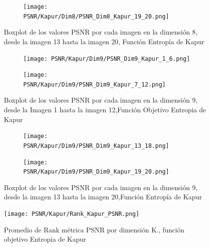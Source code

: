 \documentclass[conference]{IEEEtran}
\begin{document}
\begin{figure}[htbp]
	\centering

	\begin{subfigure}{0.5\textwidth}
		\centering
		\texttt{[image: PSNR/Kapur/Dim8/PSNR\_Dim8\_Kapur\_19\_20.png]}
	\end{subfigure}
	\caption{Boxplot de los valores PSNR por cada imagen en la dimensión 8, desde la imagen 13 hasta la imagen 20, Función Entropía de Kapur}
	\label{fig:imagenes_dim8_13_20}    
\end{figure}


\begin{figure}[htbp]
	\centering
	
	\begin{subfigure}{0.5\textwidth}
		\texttt{[image: PSNR/Kapur/Dim9/PSNR\_Dim9\_Kapur\_1\_6.png]}
	\end{subfigure}
	
	\begin{subfigure}{0.5\textwidth}
		\texttt{[image: PSNR/Kapur/Dim9/PSNR\_Dim9\_Kapur\_7\_12.png]}
	\end{subfigure}
	\caption{Boxplot de los valores PSNR por cada imagen en la dimensión 9, desde la Imagen 1 hasta la imagen 12,Función Objetivo Entropia de Kapur}
	\label{fig:imagenes}    
\end{figure}

\begin{figure}
	\centering
	\begin{subfigure}{0.5\textwidth}
		\texttt{[image: PSNR/Kapur/Dim9/PSNR\_Dim9\_Kapur\_13\_18.png]}
	\end{subfigure}   
	\begin{subfigure}{0.5\textwidth}
		\texttt{[image: PSNR/Kapur/Dim9/PSNR\_Dim9\_Kapur\_19\_20.png]}
		\vspace{-150pt} %
	\end{subfigure}
	\caption{Boxplot de los valores PSNR por cada imagen en la dimensión 9, desde la imagen 13 hasta la imagen 20,Función Entropía de Kapur}
	\label{fig:imagenes}    
\end{figure}



\begin{figure}[htbp]
    \centering
    \texttt{[image: PSNR/Kapur/Rank\_Kapur\_PSNR.png]}
    \caption{Promedio de Rank métrica PSNR por dimensión K., función objetivo Entropia de Kapur}
    \label{fig:fig511}
\end{figure}
\end{document}

